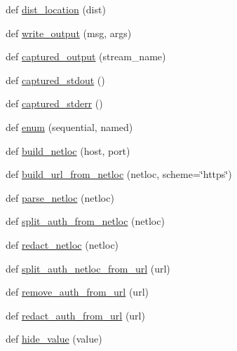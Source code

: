 \begin{DoxyCompactItemize}
\item 
def \hyperlink{namespacepip_1_1__internal_1_1utils_1_1misc_ae24716bcf1aee5c7c2a48f12ec75e647}{dist\+\_\+location} (dist)
\item 
def \hyperlink{namespacepip_1_1__internal_1_1utils_1_1misc_a475141640159b93c2d70b68f5435f3a4}{write\+\_\+output} (msg, args)
\item 
def \hyperlink{namespacepip_1_1__internal_1_1utils_1_1misc_a3411ad22fe24ddaccc0342d1f68eb0db}{captured\+\_\+output} (stream\+\_\+name)
\item 
def \hyperlink{namespacepip_1_1__internal_1_1utils_1_1misc_ac1d3d1a40555a46ed9f931208d3cbdc9}{captured\+\_\+stdout} ()
\item 
def \hyperlink{namespacepip_1_1__internal_1_1utils_1_1misc_a83f5a831d098f26759567f070646ef49}{captured\+\_\+stderr} ()
\item 
def \hyperlink{namespacepip_1_1__internal_1_1utils_1_1misc_aa23cdf3c7f78cefe2c18a9946c151f1b}{enum} (sequential, named)
\item 
def \hyperlink{namespacepip_1_1__internal_1_1utils_1_1misc_a847f7057fa8b6316f423717b479606ac}{build\+\_\+netloc} (host, port)
\item 
def \hyperlink{namespacepip_1_1__internal_1_1utils_1_1misc_a26814f24347ef6f8f107760385e2b799}{build\+\_\+url\+\_\+from\+\_\+netloc} (netloc, scheme=\char`\"{}https\char`\"{})
\item 
def \hyperlink{namespacepip_1_1__internal_1_1utils_1_1misc_ad6a468c642f6c3faa6cc8464cd9ae654}{parse\+\_\+netloc} (netloc)
\item 
def \hyperlink{namespacepip_1_1__internal_1_1utils_1_1misc_a4f7ed628264a14243cddbdbddf4b36e8}{split\+\_\+auth\+\_\+from\+\_\+netloc} (netloc)
\item 
def \hyperlink{namespacepip_1_1__internal_1_1utils_1_1misc_aac092fd7cd598e5515b827d32a45e530}{redact\+\_\+netloc} (netloc)
\item 
def \hyperlink{namespacepip_1_1__internal_1_1utils_1_1misc_ac00e7e8295d8c5fd6e30534a3ef457ca}{split\+\_\+auth\+\_\+netloc\+\_\+from\+\_\+url} (url)
\item 
def \hyperlink{namespacepip_1_1__internal_1_1utils_1_1misc_ab86409360d3b9ff8c6e22c43783244f9}{remove\+\_\+auth\+\_\+from\+\_\+url} (url)
\item 
def \hyperlink{namespacepip_1_1__internal_1_1utils_1_1misc_a751f3cb047166ae80782e0d1d7c6c7c7}{redact\+\_\+auth\+\_\+from\+\_\+url} (url)
\item 
def \hyperlink{namespacepip_1_1__internal_1_1utils_1_1misc_af547eca8fc188f0f15a95a422be8d1a3}{hide\+\_\+value} (value)

\end{DoxyCompactItemize}
